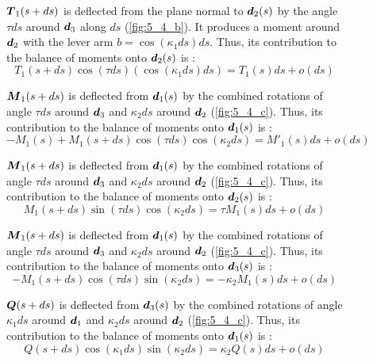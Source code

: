 \begin{figure}[p]
\begin{fullpage}
		$\boldsymbol{T}_1(s+ds)$ is deflected from the plane normal to $\boldsymbol{d}_2(s)$ by the angle $\tau ds$ around $\boldsymbol{d}_3$ along $ds$ (\cref{fig:5_4_b}). It produces a moment around $\boldsymbol{d}_2$ with the lever arm $b =  \cos(\kappa_1 ds) ds$. Thus, its contribution to the balance of moments onto $\boldsymbol{d}_2(s)$ is : 
	\begin{equation*}
		T_1(s+ds) \cos(\tau ds) (\cos(\kappa_1 ds) ds) = T_1(s) ds + o(ds)
	\end{equation*}
	
	$\boldsymbol{M}_1(s+ds)$ is deflected from $\boldsymbol{d}_1(s)$ by the combined rotations of angle $\tau ds$ around $\boldsymbol{d}_3$ and $\kappa_2 ds$ around $\boldsymbol{d}_2$ (\cref{fig:5_4_c}). Thus, its contribution to the balance of moments onto $\boldsymbol{d}_1(s)$ is : 
	\begin{equation*}
		-M_1(s) + M_1(s+ds) \cos(\tau ds) \cos(\kappa_2 ds) = M'_1 (s) ds + o(ds)
	\end{equation*}	
	
	$\boldsymbol{M}_1(s+ds)$ is deflected from $\boldsymbol{d}_1(s)$ by the combined rotations of angle $\tau ds$ around $\boldsymbol{d}_3$ and $\kappa_2 ds$ around $\boldsymbol{d}_2$ (\cref{fig:5_4_c}). Thus, its contribution to the balance of moments onto $\boldsymbol{d}_2(s)$ is : 
	\begin{equation*}
		M_1(s+ds) \sin(\tau ds) \cos(\kappa_2 ds) = \tau M_1 (s) ds + o(ds)
	\end{equation*}	
	
	$\boldsymbol{M}_1(s+ds)$ is deflected from $\boldsymbol{d}_1(s)$ by the combined rotations of angle $\tau ds$ around $\boldsymbol{d}_3$ and $\kappa_2 ds$ around $\boldsymbol{d}_2$ (\cref{fig:5_4_c}). Thus, its contribution to the balance of moments onto $\boldsymbol{d}_3(s)$ is : 
	\begin{equation*}
		-M_1(s+ds) \cos(\tau ds) \sin(\kappa_2 ds) = -\kappa_2 M_1 (s) ds + o(ds)
	\end{equation*}	
	
	$\boldsymbol{Q}(s+ds)$ is deflected from $\boldsymbol{d}_3(s)$ by the combined rotations of angle $\kappa_1 ds$ around $\boldsymbol{d}_1$ and $\kappa_2 ds$ around $\boldsymbol{d}_2$ (\cref{fig:5_4_c}). Thus, its contribution to the balance of moments onto $\boldsymbol{d}_1(s)$ is : 
	\begin{equation*}
		Q(s+ds) \cos(\kappa_1 ds) \sin(\kappa_2 ds) = \kappa_2 Q(s) ds + o(ds)
	\end{equation*}	
	  \end{fullpage}
\end{figure}

\clearpage
